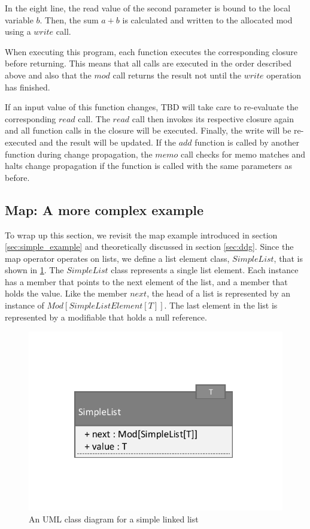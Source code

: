 In the eight line, the read value of the second parameter is bound to the local variable $b$. Then, the sum $a + b$ is calculated and written to the allocated mod using a $write$ call. 

When executing this program, each function executes the corresponding closure before returning. This means that all calls are executed in the order described above and also that the $mod$ call returns the result not until the $write$ operation has finished. 

If an input value of this function changes, TBD will take care to re-evaluate the corresponding $read$ call. The $read$ call then invokes its respective closure again and all function calls in the closure will be executed. Finally, the write will be re-executed and the result will be updated. If the $add$ function is called by another function during change propagation, the $memo$ call checks for memo matches and halts change propagation if the function is called with the same parameters as before. 

\subsection{Map: A more complex example}
\label{sec:tbd_memo_map}

To wrap up this section, we revisit the map example introduced in section \ref{sec:simple_example} and theoretically discussed in section \ref{sec:ddg}. Since the map operator operates on lists, we define a list element class, $SimpleList$, that is shown in \ref{fig:simple_list_uml}. The $SimpleList$ class represents a single list element. Each instance has a member that points to the next element of the list, and a member that holds the value. Like the member $next$, the head of a list is represented by an instance of $Mod[SimpleListElement[T]]$. The last element in the list is represented by a modifiable that holds a null reference.  

\begin{figure}
\begin{center}
\includegraphics[scale=0.7]{uml/SimpleList.pdf}
\end{center}
\caption{An UML class diagram for a simple linked list}
\label{fig:simple_list_uml}
\end{figure}

